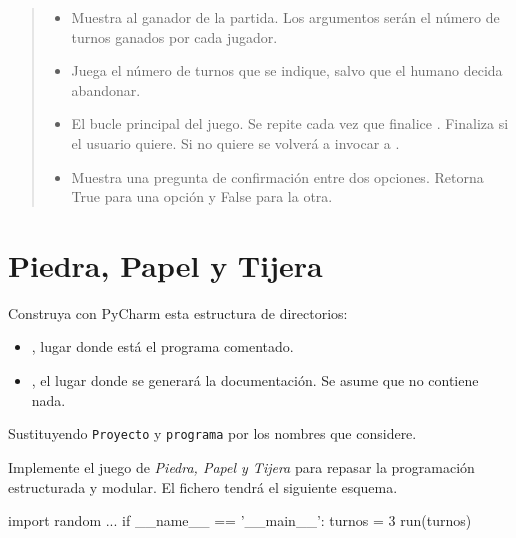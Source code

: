\begin{quote}
\begin{itemize}
\item[]  Muestra al ganador de la partida. Los argumentos serán el número de turnos ganados por cada jugador.

\item[]  Juega el número de turnos que se indique, salvo que el humano decida abandonar.

\item[]  El bucle principal del juego. Se repite cada vez que finalice . Finaliza si el usuario quiere. Si no quiere se volverá a invocar a . 

\item[]  Muestra una pregunta de confirmación entre dos opciones. Retorna True para una opción y False para la otra.
\end{itemize}
\end{quote}



\separacion
\section{Piedra, Papel y Tijera}


Construya con PyCharm esta estructura de directorios:
\begin{itemize}
\item[] , lugar donde está el programa comentado.
\item[] , el lugar donde se generará la documentación. Se asume que no contiene nada.
\end{itemize}
Sustituyendo \texttt{Proyecto} y \texttt{programa} por los nombres que considere.

Implemente el juego de \textit{Piedra, Papel y Tijera} para repasar la programación 
estructurada y modular. El fichero  tendrá el siguiente esquema.

\hfil\begin{minipage}{.3\textwidth}
\begin{pyverbatim}[][frame=single]
import random
...
if __name__ == '__main__':
    turnos = 3
    run(turnos)
\end{pyverbatim}
\end{minipage}


